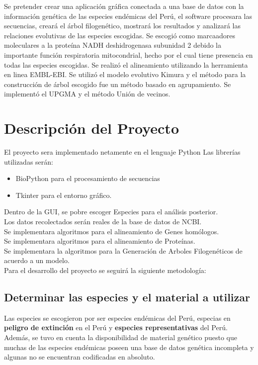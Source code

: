 \documentclass[a4paper]{article}
\begin{document}
Se pretender crear una aplicación gráfica conectada a una base de datos con la información genética de las especies endémicas del Perú, el software procesara las secuencias, creará el árbol filogenético, mostrará los resultados y analizará las relaciones evolutivas de las especies escogidas.
Se escogió como marcaadores moleculares a la proteína NADH deshidrogenasa subunidad 2 debido la importante función respiratoria mitocondrial, hecho por el cual tiene presencia en todas las especies escogidas.
Se realizó el alineamiento utilizando la herramienta en linea EMBL-EBI.
Se utilizó el modelo evolutivo Kimura y el método para la construcción de árbol escogido fue un método basado en agrupamiento.
Se implementó el UPGMA y el método Unión de vecinos.

\section{Descripción del Proyecto}

El proyecto sera implementado netamente en el lenguaje Python
Las librerías utilizadas serán:
\begin{itemize}
\item BioPython para el procesamiento de secuencias
\item Tkinter para el entorno gráfico.
\end{itemize}
Dentro de la GUI, se pobre escoger Especies para el análisis posterior.\\
Los datos recolectados serán reales de la base de datos de NCBI.\\
Se implementara algoritmos para el alineamiento de Genes homólogos.\\
Se implementara algoritmos para el alineamiento de Proteínas.\\
Se implementara la algoritmos para la Generación de Arboles Filogenéticos de acuerdo a un modelo.\\

\noindent Para el desarrollo del proyecto se seguirá la siguiente metodología:

\subsection{Determinar las especies y el material a utilizar}

Las especies se escogieron por ser especies endémicas del Perú, especias en \textbf{peligro de extinción} en el Perú y \textbf{especies representativas} del Perú. Además, se tuvo en cuenta la disponibilidad de material genético puesto que muchas de las especies endémicas poseen una base de datos genética incompleta y algunas no se encuentran codificadas en absoluto.\\
\end{document}
